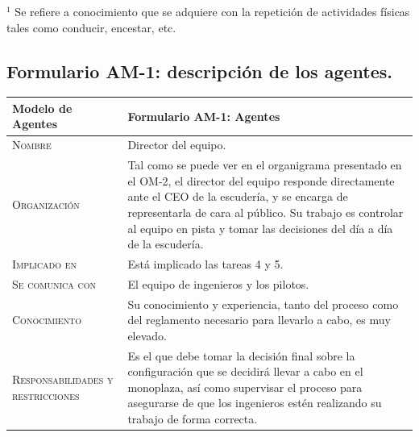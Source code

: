\documentclass[12pt,a4paper,twoside,spanish]{article}      %
\begin{document}
{\scriptsize \noindent $^1$ Se refiere a conocimiento que se
adquiere con la repetición de actividades físicas tales como
conducir, encestar, etc.}

\pagebreak
\subsection{Formulario AM-1: descripción de los agentes.}

\begin{table}[H]
\scriptsize
\begin{tabularx}{\textwidth}{|l|X|} \hline
\textbf{Modelo de Agentes} & \textbf{Formulario AM-1: Agentes} \\ \hline\hline
\textsc{Nombre} &  
Director del equipo.
\\ \hline

\textsc{Organización} &  
Tal como se puede ver en el organigrama presentado en el OM-2, el director del equipo responde directamente ante el CEO de la escudería, y se encarga de representarla de cara al público. Su trabajo es controlar al equipo en pista y tomar las decisiones del día a día de la escudería.
\\ \hline

\textsc{Implicado en} & 
Está implicado las tareas 4 y 5.
\\ \hline

\textsc{Se comunica con} & 
El equipo de ingenieros y los pilotos.
\\ \hline

\textsc{Conocimiento} &  
Su conocimiento y experiencia, tanto del proceso como del reglamento necesario para llevarlo a cabo, es muy elevado.
\\ \hline

\textsc{Responsabilidades y restricciones} & 
Es el que debe tomar la decisión final sobre la configuración que se decidirá llevar a cabo en el monoplaza, así como supervisar el proceso para asegurarse de que los ingenieros estén realizando su trabajo de forma correcta.
\\ \hline
\end{tabularx}
 \label{tab.AM1}
\end{table}
\end{document}

